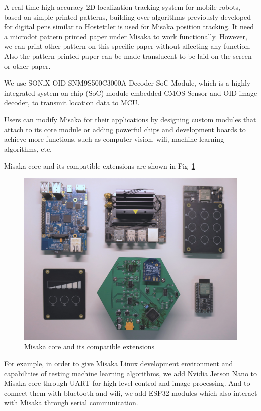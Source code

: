 \documentclass[conference]{IEEEtran}
\begin{document}

A real-time high-accuracy 2D localization tracking system for mobile robots, based on simple printed patterns, building over algorithms previously developed for digital pens similar to Hostettler\cite{hostettler2016real} is used
for Misaka position tracking. It need a microdot pattern printed paper under Misaka to work functionally. However, we can print other pattern on this specific paper without affecting any function. Also the pattern printed paper can be made translucent to be laid on the screen or other paper.

We use SONiX OID SNM9S500C3000A Decoder SoC Module, which is a highly integrated system-on-chip (SoC) module embedded CMOS Sensor and OID image decoder, to transmit location data to MCU.


Users can modify Misaka for their applications by designing custom modules that attach to its core module or adding powerful chips and development boards to achieve more functions, such as computer vision, wifi, machine learning algorithms, etc.

Misaka core and its compatible extensions are shown in Fig~\ref{fig:extension}

\begin{figure}[htbp]
    \centering
    \includegraphics[width=0.8\columnwidth]{extensions.jpg}
    \caption{Misaka core and its compatible extensions}
    \label{fig:extension}
\end{figure}

For example, in order to give Misaka Linux development environment and capabilities of testing machine learning algorithms, we add Nvidia Jetson Nano to Misaka core through UART for high-level control and image processing. And to connect them with bluetooth and wifi, we add ESP32 modules which also interact with Misaka through serial communication. 
\end{document}
